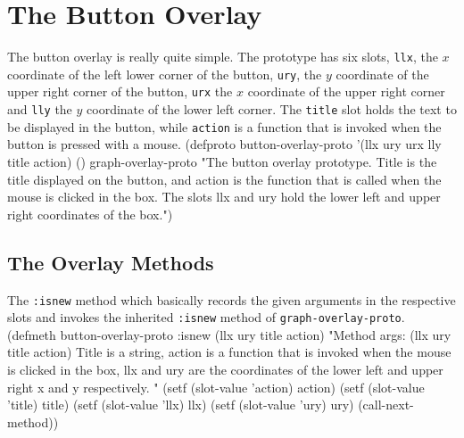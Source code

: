 \section{The Button Overlay}
\label{sec:button-proto}
The button overlay is really quite simple. The prototype has six
slots, {\tt{}llx}, the $x$ coordinate of the left lower corner of the
button, {\tt{}ury}, the $y$ coordinate of the upper right corner of the
button, {\tt{}urx} the $x$ coordinate of the upper right corner and
{\tt{}lly} the $y$ coordinate of the lower left corner. The {\tt{}title}
slot holds the text to be displayed in the button, while {\tt{}action} is
a function that is invoked when the button is pressed with a mouse.
\nwenddocs{}\endmoddef
(defproto button-overlay-proto '(llx ury urx lly title action) ()
  graph-overlay-proto
  "The button overlay prototype. Title is the title displayed on the
  button, and action is the function that is called when the mouse is
  clicked in the box. The slots llx and ury hold the lower left and
  upper right coordinates of the box.")
\eatline
{}\nwendcode{}\nwdocspar

\subsection{The Overlay Methods}
\label{sec:overlay-methods}
The {\tt{}:isnew} method which basically records the given arguments in
the respective slots and invokes the inherited {\tt{}:isnew} method of
{\tt{}graph-overlay-proto}.
\nwenddocs{}\endmoddef
(defmeth button-overlay-proto :isnew (llx ury title action)
  "Method args: (llx ury title action)
Title is a string, action is a function that is invoked when
the mouse is clicked in the box, llx and ury are the coordinates of
the lower left and upper right x and y respectively. "
  (setf (slot-value 'action) action)
  (setf (slot-value 'title) title)
  (setf (slot-value 'llx) llx)
  (setf (slot-value 'ury) ury)
  (call-next-method))
\eatline
{}\nwendcode{}\nwdocspar

